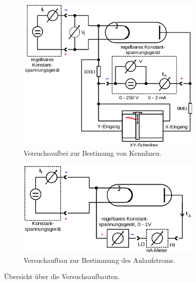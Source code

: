 \begin{figure}
\centering
  \begin{subfigure}{0.4\textwidth}
    \centering
    \includegraphics[width=\textwidth]{aufbkenn.png}
    \caption{Versuchsaufbei zur Bestimung von Kennlinen\cite{anleitung}.}
    \label{abb:7}
  \end{subfigure}
  \begin{subfigure}{0.4\textwidth}
    \centering
    \includegraphics[width=\textwidth]{aufbanl.png}
    \caption{Versuchaufbau zur Bestimmung des Anlaufstroms\cite{anleitung}.}
    \label{abb:8}
  \end{subfigure}
  \caption{Übersicht über die Versuchsaufbauten.}
\end{figure}
